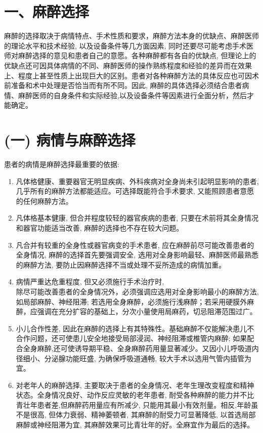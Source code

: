 \documentclass[10pt]{article}
\begin{document}
\section*{一、麻醉选择}
麻醉的选择取决于病情特点、手术性质和要求，麻醉方法本身的优缺点、麻醉医师的理论水平和技术经验, 以及设备条件等几方面因素, 同时还要尽可能考虑手术医师对麻醉选择的意见和患者自己的意愿。各种麻醉都有各自的优缺点, 但理论上的优缺点还可因具体病情的不同、麻醉医师的操作熟练程度和经验的差异而在效果上、程度上甚至性质上出现巨大的区别。患者对各种麻醉方法的具体反应也可因术前准备和术中处理是否恰当而有所不同。因此, 麻醉的具体选择必须结合患者病情、麻醉医师的自身条件和实际经验,以及设备条件等因素进行全面分析，然后才能确定。

\section*{(一) 病情与麻醉选择}
患者的病情是麻醉选择最重要的依据:

\begin{enumerate}
  \item 凡体格健康、重要器官无明显疾病、外科疾病对全身尚未引起明显影响的患者, 几乎所有的麻醉方法都能适应。可选择既能符合手术要求, 又能照顾患者意愿的任何麻醉方法。

  \item 凡体格基本健康, 但合并程度较轻的器官疾病的患者, 只要在术前将其全身情况和器官功能适当改善, 麻醉的选择也不存在较大问题。

  \item 凡合并有较重的全身性或器官病变的手术患者, 应在麻醉前尽可能改善患者的全身情况, 麻醉的选择首先要强调安全, 选用对全身影响最轻、麻醉医师最熟悉的麻醉方法, 要防止因麻醉选择不当或处理不妥所造成的病情加重。

  \item 病情严重达危重程度, 但又必须施行手术治疗时,\\
除尽可能改善患者的全身情况外，必须强调应选用对全身影响最小的麻醉方法, 如局部麻醉、神经阻滞; 若选用全身麻醉，必须施行浅麻醉；若采用硬膜外麻醉，应强调在充分扩容的基础上，分次小量使用局麻药，切忌阻滞范围过广。

  \item 小儿合作性差, 因此在麻醉的选择上有其特殊性。基础麻醉不仅能解决患儿不合作问题，还可使患儿安全地接受局部浸润、神经阻滞或椎管内麻醉; 如果配合全身麻醉,还可使诱导期平稳、全身麻醉药用量显著减少。又因小儿呼吸道内径细小、分泌腺功能旺盛, 为确保呼吸道通畅, 较大手术以选用气管内插管为宜。

  \item 对老年人的麻醉选择, 主要取决于患者的全身情况、老年生理改变程度和精神状态。全身情况良好、动作反应灵敏的老年患者, 耐受各种麻醉的能力并不比青壮年患者差,但麻醉药用量应有所减少, 只能用其最小有效剂量。相反,年龄虽不是很高, 但体力衰弱、精神萎顿者, 其麻醉的耐受力可显著降低, 以首选局部麻醉或神经阻滞为宜, 其麻醉效果可比青壮年的好。全麻宜作为最后的选择。

\end{enumerate}
\end{document}
